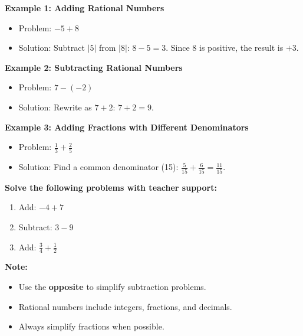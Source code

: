 \documentclass[12pt]{article}
\begin{document}
\begin{tcolorbox}[colframe=black!60, colback=white, 
coltitle=black, colbacktitle=black!15, fonttitle=\bfseries\Large, 
title=Examples, halign title=center, left=10pt, right=10pt, top=10pt, bottom=15pt]
\textbf{Example 1: Adding Rational Numbers}
\begin{itemize}
    \item Problem: \( -5 + 8 \)
    \item Solution: Subtract \( |5| \) from \( |8| \): \( 8 - 5 = 3 \). Since 8 is positive, the result is \( +3 \).
\end{itemize}

\textbf{Example 2: Subtracting Rational Numbers}
\begin{itemize}
    \item Problem: \( 7 - (-2) \)
    \item Solution: Rewrite as \( 7 + 2 \): \( 7 + 2 = 9 \).
\end{itemize}

\textbf{Example 3: Adding Fractions with Different Denominators}
\begin{itemize}
    \item Problem: \( \frac{1}{3} + \frac{2}{5} \)
    \item Solution: Find a common denominator (15): \( \frac{5}{15} + \frac{6}{15} = \frac{11}{15} \).
\end{itemize}
\end{tcolorbox}

\vspace{1em}

\begin{tcolorbox}[colframe=black!60, colback=white, 
coltitle=black, colbacktitle=black!15, fonttitle=\bfseries\Large, 
title=Guided Practice, halign title=center, left=10pt, right=10pt, top=10pt, bottom=15pt]
\textbf{Solve the following problems with teacher support:}
\begin{enumerate}[itemsep=5em] %
    \item Add: \( -4 + 7 \)
    \item Subtract: \( 3 - 9 \)
    \item Add: \( \frac{3}{4} + \frac{1}{2} \)
\end{enumerate}
\end{tcolorbox}

\vspace{1em}

\begin{tcolorbox}[colframe=black!40, colback=gray!5, 
coltitle=black, colbacktitle=black!20, fonttitle=\bfseries\Large, 
title=Additional Notes, halign title=center, left=5pt, right=5pt, top=5pt, bottom=15pt]
\textbf{Note:}
\begin{itemize}
    \item Use the \textbf{opposite} to simplify subtraction problems.
    \item Rational numbers include integers, fractions, and decimals.
    \item Always simplify fractions when possible.
\end{itemize}
\end{tcolorbox}
\end{document}
